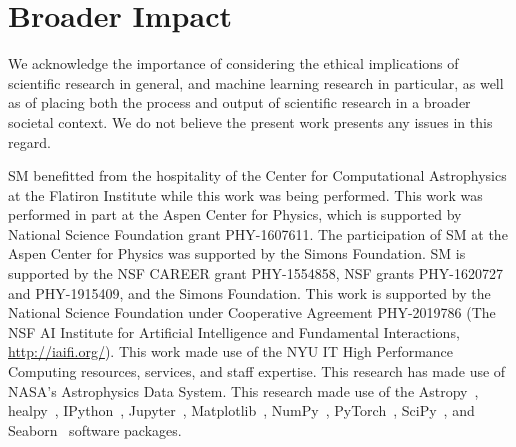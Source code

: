 \documentclass[]{article}
\begin{document}

\section*{Broader Impact}
\label{sec:impact}

We acknowledge the importance of considering the ethical implications of scientific research in general, and machine learning research in particular, as well as of placing both the process and output of scientific research in a broader societal context. We do not believe the present work presents any issues in this regard. 

\begin{ack}
SM benefitted from the hospitality of the Center for Computational Astrophysics at the Flatiron Institute while this work was being performed. 
This work was performed in part at the Aspen Center for Physics, which is supported by National Science Foundation grant PHY-1607611.
The participation of SM at the Aspen Center for Physics was supported by the Simons Foundation.
SM is supported by the NSF CAREER grant PHY-1554858, NSF grants PHY-1620727 and PHY-1915409, and the Simons Foundation. 
This work is supported by the National Science Foundation under Cooperative Agreement PHY-2019786 (The NSF AI Institute for Artificial Intelligence and Fundamental Interactions, \url{http://iaifi.org/}).
This work made use of the NYU IT High Performance Computing resources, services, and staff expertise. 
This research has made use of NASA's Astrophysics Data System. 
This research made use of the Astropy~\cite{Robitaille:2013mpa,Price-Whelan:2018hus},
healpy~\cite{Gorski:2004by,Zonca2019},
IPython~\cite{PER-GRA:2007},
Jupyter~\cite{Kluyver2016JupyterN},
Matplotlib~\cite{Hunter:2007},
NumPy~\cite{harris_array_2020},
PyTorch~\cite{NEURIPS2019_9015},
SciPy~\cite{2020SciPy-NMeth}, and
Seaborn~\cite{michael_waskom_2017_883859}
software packages.
\end{ack}



\end{document}
